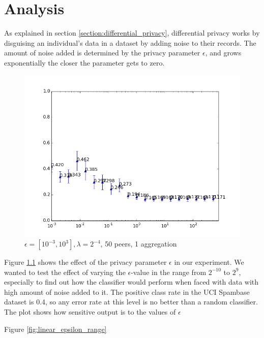 
\chapter{Analysis}

As explained in section \ref{section:differential_privacy}, differential privacy works by disguising an individual's data in a dataset by adding noise to their records. The amount of noise added is determined by the privacy parameter  $\epsilon$, and grows exponentially the closer the parameter gets to zero. 

\begin{figure}[h!]
	\centering
	\includegraphics[width=\textwidth]{fig/eps2e-10-2e9,bud=eps,peers50,groups50,reg2e-4}
 	\caption{$\epsilon = [10^{-3}, 10^{3}], \lambda = 2^{-4}$, 50 peers, 1 aggregation}
 	\label{fig:epsilon_big_range}
\end{figure}
 
Figure \ref{fig:epsilon_big_range} shows the effect of the privacy parameter $\epsilon$ in our experiment. We wanted to test the effect of varying the $\epsilon$-value in the range from $2^{-10}$ to $2^9$, especially to find out how the classifier would perform when faced with data with high amount of noise added to it. The positive class rate in the UCI Spambase dataset is 0.4, so any error rate at this level is no better than a random classifier. The plot shows how sensitive output is to the values of $\epsilon$



Figure \ref{fig:linear_epsilon_range} 

